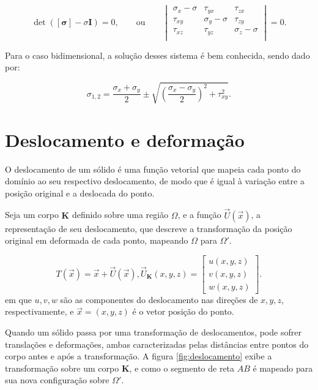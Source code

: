 \begin{equation}
    \det{([\bm{\sigma}] - \sigma \bm{I})} = 0, \qquad \text{ou} \qquad \begin{vmatrix}
        \sigma_x - \sigma & \tau_{yx} & \tau_{zx} \\
        \tau_{xy} & \sigma_{y} - \sigma & \tau_{zy} \\
        \tau_{xz} & \tau_{yz} & \sigma_{z} - \sigma \\
    \end{vmatrix} = 0.
\end{equation}

Para o caso bidimensional, a solução desses sistema é bem conhecida, sendo dado por:

\begin{equation}
    \sigma_{1,2} = \frac{\sigma_x + \sigma_y}{2} \pm \sqrt{\left(\frac{\sigma_x - \sigma_y}{2}\right)^2 + \tau_{xy}^2}.
\end{equation}

\section{Deslocamento e deformação}

O deslocamento de um sólido é uma função vetorial que mapeia cada ponto do domínio ao seu respectivo deslocamento, de modo que é igual à variação entre a posição original e a deslocada do ponto.

Seja um corpo $\bm{K}$ definido sobre uma região $\Omega$, e a função $\vec{U}(\vec{x})$, a representação de seu deslocamento, que descreve a transformação da posição original em deformada de cada ponto, mapeando $\Omega$ para $\Omega'$.

\begin{equation}
    T(\vec{x}) = \vec{x} + \vec{U}(\vec{x}),
    \vec{U}_{\bm{K}}(x,y,z) = \begin{bmatrix}
        u(x,y,z) \\ v(x,y,z) \\ w(x,y,z) 
    \end{bmatrix}.
    \label{eq:transformacao}
\end{equation}
em que $u, v, w$ são as componentes do deslocamento nas direções de $x, y, z$, respectivamente, e $\vec{x} = (x,y,z)$ é o vetor posição do ponto.



Quando um sólido passa por uma transformação de deslocamentos, pode sofrer translações e deformações, ambas caracterizadas pelas distâncias entre pontos do corpo antes e após a transformação. A figura \ref{fig:deslocamento} exibe a transformação sobre um corpo $\bm{K}$, e como o segmento de reta $AB$ é mapeado para sua nova configuração sobre $\Omega'$.

